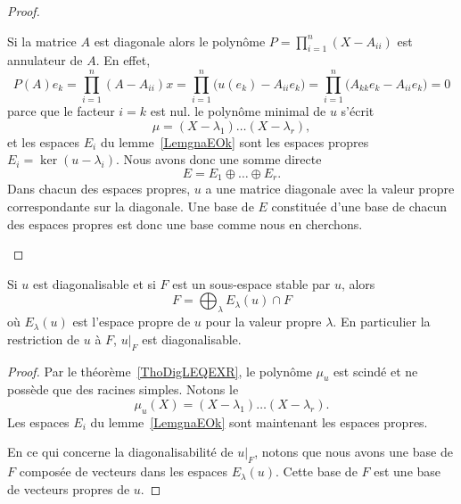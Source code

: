 \begin{proof}
\begin{subproof}
		Si la matrice \( A\) est diagonale alors le polynôme \( P=\prod_{i=1}^n(X-A_{ii})\) est annulateur de \( A\). En effet,
		\begin{equation}
			P(A)e_k=\prod_{i=1}^n(A-A_{ii})x=\prod_{i=1}^n\big( u(e_k)-A_{ii}e_k \big)=\prod_{i=1}^n\big( A_{kk}e_k-A_{ii}e_k \big)=0
		\end{equation}
		parce que le facteur \( i=k\) est nul.
		le polynôme minimal de \( u\) s'écrit
		\begin{equation}
			\mu=(X-\lambda_1)\ldots(X-\lambda_r),
		\end{equation}
		et les espaces \( E_i\) du lemme~\ref{LemgnaEOk} sont les espaces propres \( E_i=\ker(u-\lambda_i)\). Nous avons donc une somme directe
		\begin{equation}
			E=E_1\oplus\ldots\oplus E_r.
		\end{equation}
		Dans chacun des espaces propres, \( u\) a une matrice diagonale avec la valeur propre correspondante sur la diagonale. Une base de \( E\) constituée d'une base de chacun des espaces propres est donc une base comme nous en cherchons.
	\end{subproof}
\end{proof}

\begin{corollary}       \label{CorQeVqsS}
	Si \( u\) est diagonalisable et si \( F\) est un sous-espace stable par \( u\), alors
	\begin{equation}
		F=\bigoplus_{\lambda}E_{\lambda}(u)\cap F
	\end{equation}
	où \( E_{\lambda}(u)\) est l'espace propre de \( u\) pour la valeur propre \( \lambda\). En particulier la restriction de \( u\) à \( F\), \( u|_F\) est diagonalisable.
\end{corollary}

\begin{proof}
	Par le théorème~\ref{ThoDigLEQEXR}, le polynôme \( \mu_u\) est scindé et ne possède que des racines simples. Notons le
	\begin{equation}
		\mu_u(X)=(X-\lambda_1)\ldots (X-\lambda_r).
	\end{equation}
	Les espaces \( E_i\) du lemme~\ref{LemgnaEOk} sont maintenant les espaces propres.

	En ce qui concerne la diagonalisabilité de \( u|_F\), notons que nous avons une base de \( F\) composée de vecteurs dans les espaces \( E_{\lambda}(u)\). Cette base de \( F\) est une base de vecteurs propres de \( u\).
\end{proof}

